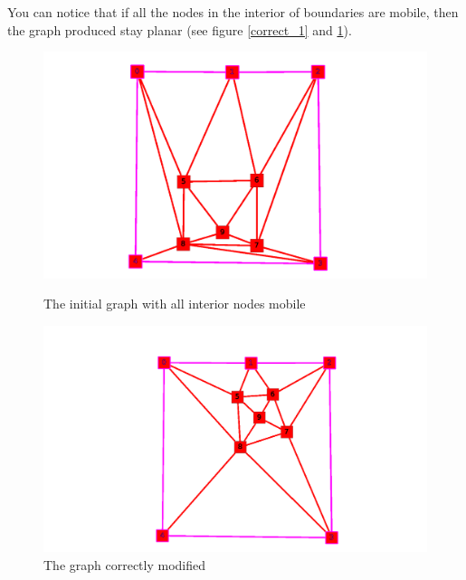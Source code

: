 
You can notice that if all the nodes in the interior of boundaries are mobile, then the graph produced stay planar (see figure \ref{correct_1} and \ref{correct_2}).

\begin{figure}[!h]
  \begin{minipage}[!h]{.5\linewidth}
    \includegraphics[scale=0.27]{snapshots/constate_mobil_init.png}
    \caption{The initial graph with all interior nodes mobile}
    \label{correct_1}
  \end{minipage}
  \begin{minipage}[!h]{.55\linewidth}
    \centering
    \includegraphics[scale=0.29]{snapshots/constate_nikel.png}
    \caption{The graph correctly modified}
    \label{correct_2}
  \end{minipage} \hfill
\end{figure}
